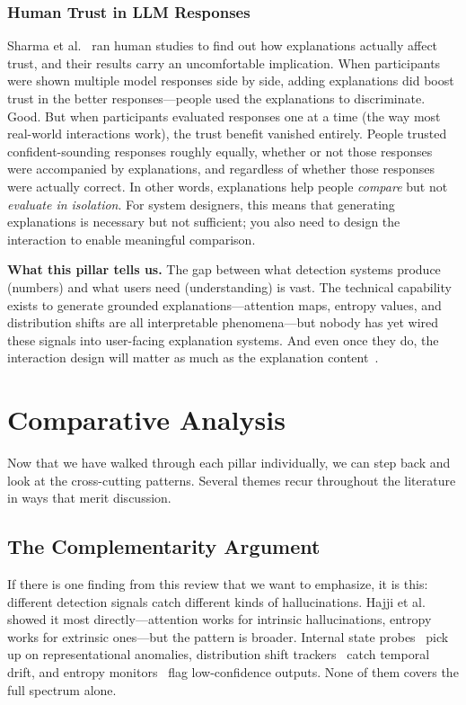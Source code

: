 \documentclass[journal]{IEEEtran}
\begin{document}
\subsubsection{Human Trust in LLM Responses}
Sharma et al.~\cite{human_trust} ran human studies to find out how explanations actually affect trust, and their results carry an uncomfortable implication. When participants were shown multiple model responses side by side, adding explanations did boost trust in the better responses---people used the explanations to discriminate. Good. But when participants evaluated responses one at a time (the way most real-world interactions work), the trust benefit vanished entirely. People trusted confident-sounding responses roughly equally, whether or not those responses were accompanied by explanations, and regardless of whether those responses were actually correct. In other words, explanations help people \emph{compare} but not \emph{evaluate in isolation}. For system designers, this means that generating explanations is necessary but not sufficient; you also need to design the interaction to enable meaningful comparison.

\textbf{What this pillar tells us.} The gap between what detection systems produce (numbers) and what users need (understanding) is vast. The technical capability exists to generate grounded explanations---attention maps, entropy values, and distribution shifts are all interpretable phenomena---but nobody has yet wired these signals into user-facing explanation systems. And even once they do, the interaction design will matter as much as the explanation content~\cite{human_trust}.

\section{Comparative Analysis}

Now that we have walked through each pillar individually, we can step back and look at the cross-cutting patterns. Several themes recur throughout the literature in ways that merit discussion.

\subsection{The Complementarity Argument}

If there is one finding from this review that we want to emphasize, it is this: different detection signals catch different kinds of hallucinations. Hajji et al.~\cite{map_misbelief} showed it most directly---attention works for intrinsic hallucinations, entropy works for extrinsic ones---but the pattern is broader. Internal state probes~\cite{mind, mhad, sep} pick up on representational anomalies, distribution shift trackers~\cite{hallushift, hallushift_pp} catch temporal drift, and entropy monitors~\cite{semantic_energy} flag low-confidence outputs. None of them covers the full spectrum alone.
\end{document}
